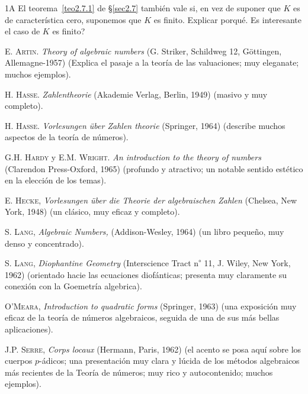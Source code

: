 \documentclass[bibtotoc,leqno,spanish]{amsbook}
\numberwithin{equation}{section}
\theoremstyle{note}
\newcommand{\exername}{}
\newtheorem*{namedexer}{\exername}
\newenvironment{exer*}[1]{\renewcommand{\exername}{#1}\begin{namedexer}}{\end{namedexer}}
\theoremstyle{note}
\theoremstyle{rem}
\numberwithin{theorem}{section}
\numberwithin{proposition}{section}
\numberwithin{definition}{section}
\numberwithin{lemma}{section}
\numberwithin{corollary}{section}
\numberwithin{example}{section}
\numberwithin{footnote}{section}%
\begin{document}
\begin{exer*}{1A}
El teorema~\ref{teo2.7.1} de \S\ref{sec2.7} tambi\'en vale si, en vez de suponer que $K$ es
de caracter\'istica cero, suponemos que $K$ es finito. Explicar porqu\'e. Es interesante
el caso de $K$ es finito?
\end{exer*}

\backmatter

\begin{thebibliography}{21}

\bibitem{} {\scshape E. Artin.} {\itshape Theory of algebraic numbers}
(G. Striker, Schildweg 12, G\"ottingen, Allemagne-1957)
(Explica el pasaje a la teor\'ia de las valuaciones; muy
eleganate; muchos ejemplos).

\bibitem{} {\scshape H. Hasse.} {\itshape Zahlentheorie}
(Akademie Verlag, Berlin, 1949) (masivo y muy completo).

\bibitem{} {\scshape H. Hasse.} {\itshape Vorlesungen \"uber
Zahlen theorie} (Springer, 1964) (describe muchos aspectos
de la teor\'ia de n\'umeros).

\bibitem{} {\scshape G.H. Hardy} y {\scshape E.M. Wright.} {\itshape An introduction to the theory
of numbers} (Clarendon Press-Oxford, 1965) (profundo y atractivo; un notable sentido est\'etico en
la elecci\'on de los temas).

\bibitem{} {\scshape E. Hecke,} {\itshape Vorlesungen \"uber die Theorie der algebraischen Zahlen}
(Chelsea, New York, 1948) (un cl\'asico, muy eficaz y completo).

\bibitem{} {\scshape S. Lang,} {\itshape Algebraic Numbers,} (Addison-Wesley, 1964) (un
libro peque\~no, muy denso y concentrado).

\bibitem{} {\scshape S. Lang,} {\itshape Diophantine Geometry} (Interscience Tract n\textsuperscript{$\circ$}
11, J. Wiley, New York, 1962) (orientado hacie las ecuaciones diof\'anticas; presenta muy claramente su
conexi\'on con la Goemetr\'ia algebrica).

\bibitem{} {\scshape O'Meara,} {\itshape Introduction to quadratic forms} (Springer, 1963) (una exposici\'on
muy eficaz de la teor\'ia de n\'umeros algebraicos, seguida de una de sus m\'as bellas aplicaciones).

\bibitem{} {\scshape J.P. Serre,} {\itshape Corps locaux} (Hermann, Paris, 1962) (el acento se posa aqu\'i
sobre los cuerpos $p$-\'adicos; una presentaci\'on muy clara y l\'ucida de los m\'etodos algebraicos m\'as
recientes de la Teor\'ia de n\'umeros; muy rico y autocontenido; muchos ejemplos).


\end{thebibliography}
\end{document}
